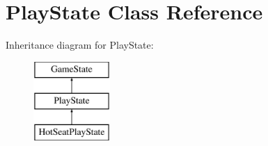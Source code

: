 \hypertarget{class_play_state}{}\section{Play\+State Class Reference}
\label{class_play_state}
Inheritance diagram for Play\+State\+:\begin{figure}[H]
\begin{center}
\leavevmode
\includegraphics[height=3.000000cm]{class_play_state}
\end{center}
\end{figure}
